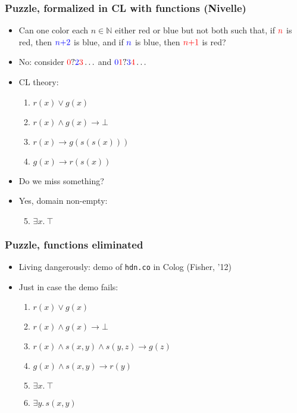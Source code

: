 \documentclass[handout,11pt]{beamer}
\newcommand{\blue}[1]{\textcolor{blue}{#1}}
\newcommand{\red}[1]{\textcolor{red}{#1}}
\newcommand{\nat}{\mathbb{N}}
\newcommand{\imp}{\rightarrow}
\begin{document}
\begin{frame}
\frametitle{Puzzle, formalized in CL with functions (Nivelle)} 
 \begin{itemize}[<+->]
     \item Can one color each
     $n\in\nat$ either red or blue but not both such that, 
     if $\red{n}$ is red, then $\blue{n{+}2}$ is blue, 
     and if  $\blue{n}$ is blue, then $\red{n{+}1}$ is red?
    \item No: consider $\red{0}?\blue{2}\red{3}\ldots$
    and $\blue{0}\red{1}?\blue{3}\red{4}\ldots$
    \item CL theory:
    \begin{enumerate}
       \item $r(x) \vee g(x)$ 
       \item $r(x) \wedge g(x) \imp \bot$
       \item $r(x) \imp g(s(s(x)))$ 
       \item $g(x) \imp r(s(x))$
     \end{enumerate}
   \item Do we miss something?
   \item Yes, domain non-empty: 
    \begin{enumerate}       
       \setcounter{enumi}{4}       
       \item $\exists x.~\top$
    \end{enumerate}
 \end{itemize}
\end{frame}

\begin{frame}
\frametitle{Puzzle, functions eliminated}
 \begin{itemize}[<+->]
    \item Living dangerously: demo of {\tt hdn.co} in Colog (Fisher, '12)
    \item Just in case the demo fails:
    \begin{enumerate}
      \item $r(x) \vee g(x)$ 
      \item $r(x) \wedge g(x) \imp \bot$
      \item $r(x) \wedge s(x,y) \wedge s(y,z) \imp g(z)$ 
      \item $g(x) \wedge s(x,y) \imp r(y)$    
      \item $\exists x.~\top$
      \item $\exists y.\,s(x,y)$
  \end{enumerate}
   \end{itemize}
\end{frame}
\end{document}
